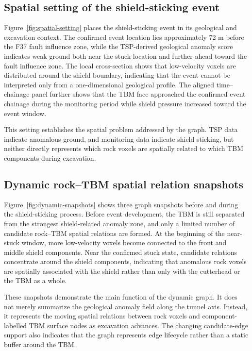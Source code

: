\subsection{Spatial setting of the shield-sticking event}
\label{sec:result-spatial-setting}

Figure~\ref{fig:spatial-setting} places the shield-sticking event in its geological and excavation context. The confirmed event location lies approximately 72 m before the F37 fault influence zone, while the TSP-derived geological anomaly score indicates weak ground both near the stuck location and further ahead toward the fault influence zone. The local cross-section shows that low-velocity voxels are distributed around the shield boundary, indicating that the event cannot be interpreted only from a one-dimensional geological profile. The aligned time--chainage panel further shows that the TBM face approached the confirmed event chainage during the monitoring period while shield pressure increased toward the event window.

This setting establishes the spatial problem addressed by the graph. TSP data indicate anomalous ground, and monitoring data indicate shield sticking, but neither directly represents which rock voxels are spatially related to which TBM components during excavation.

\subsection{Dynamic rock--TBM spatial relation snapshots}
\label{sec:result-snapshots}

Figure~\ref{fig:dynamic-snapshots} shows three graph snapshots before and during the shield-sticking process. Before event development, the TBM is still separated from the strongest shield-related anomaly zone, and only a limited number of candidate rock--TBM spatial relations are formed. At the beginning of the near-stuck window, more low-velocity voxels become connected to the front and middle shield components. Near the confirmed stuck state, candidate relations concentrate around the shield components, indicating that anomalous rock voxels are spatially associated with the shield rather than only with the cutterhead or the TBM as a whole.

These snapshots demonstrate the main function of the dynamic graph. It does not merely summarize the geological anomaly field along the tunnel axis. Instead, it represents the moving spatial relations between rock voxels and component-labelled TBM surface nodes as excavation advances. The changing candidate-edge support also indicates that the graph represents edge lifecycle rather than a static buffer around the TBM.

